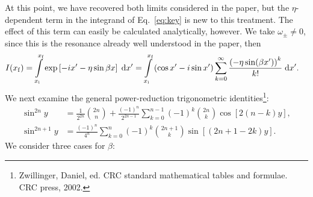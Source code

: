 \documentclass[11pt,
        usenames, %
        dvipsnames %
    ]{article}
\newcommand*{\p}[1]{\left(#1\right)}
\newcommand*{\s}[1]{\left[#1\right]}
\begin{document}
At this point, we have recovered both limits considered in the paper, but the
$\eta$-dependent term in the integrand of Eq.~\eqref{eq:key} is new to this
treatment. The effect of this term can easily be calculated analytically,
however. We take $\omega_{\pm} \neq 0$, since this is the resonance already
well understood in the paper, then
\begin{align}
    I(x_{\rm f}) = \int\limits_{x_{\rm i}}^{x_{\rm f}}
            \exp\s{-ix' - \eta \sin \beta x}\;\mathrm{d}x'
        &= \int\limits_{x_{\rm i}}^{x_{\rm f}}
            \p{\cos x' - i\sin x'}
                \sum\limits_{k = 0}^\infty
                \frac{\p{-\eta \sin (\beta x')}^k}{k!}
            \;\mathrm{d}x'.\label{eq:integral}
\end{align}
We next examine the general power-reduction trigonometric
identities\footnote{Zwillinger, Daniel, ed. CRC standard mathematical tables and
formulae. CRC press, 2002.}:
\begin{align}
    \sin^{2n}y
        &= \frac{1}{2^{2n}} \binom{2n}{n}
            + \frac{\p{-1}^n}{2^{2n - 1}}\sum\limits_{k = 0}^{n - 1}
                \p{-1}^k\binom{2n}{k}
                \cos\s{2\p{n - k}y},\label{eq:identity1}\\
    \sin^{2n + 1}y &= \frac{\p{-1}^n}{4^n}\sum\limits_{k = 0}^n
        \p{-1}^k \binom{2n + 1}{k}\sin\s{\p{2n + 1 - 2k}y}.\label{eq:identity2}
\end{align}
We consider three cases for $\beta$:
\end{document}
